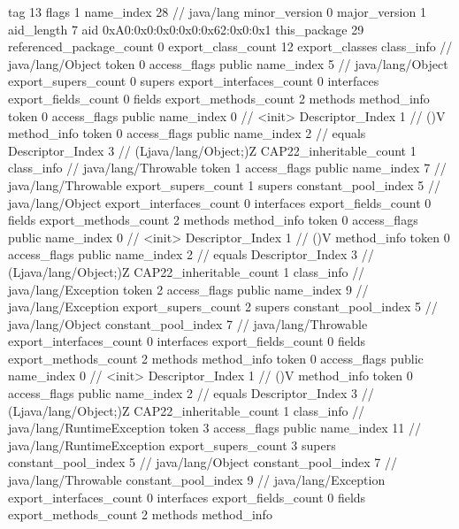 {{{			tag	13
			flags	1
			name_index	28		// java/lang
			minor_version	0
			major_version	1
			aid_length	7
			aid	0xA0:0x0:0x0:0x0:0x62:0x0:0x1
		}
	}
	this_package	29
	referenced_package_count	0
	export_class_count	12
	export_classes {
		class_info {		// java/lang/Object
			token	0
			access_flags	public
			name_index	5		// java/lang/Object
			export_supers_count	0
			supers {
			}
			export_interfaces_count	0
			interfaces {
			}
			export_fields_count	0
			fields {
			}
			export_methods_count	2
			methods {
				method_info {
					token	0
					access_flags	public
					name_index	0		// <init>
					Descriptor_Index	1		// ()V
				}
				method_info {
					token	0
					access_flags	public
					name_index	2		// equals
					Descriptor_Index	3		// (Ljava/lang/Object;)Z
				}
			}
			CAP22_inheritable_count	1
		}
		class_info {		// java/lang/Throwable
			token	1
			access_flags	public
			name_index	7		// java/lang/Throwable
			export_supers_count	1
			supers {
				constant_pool_index	5		// java/lang/Object
			}
			export_interfaces_count	0
			interfaces {
			}
			export_fields_count	0
			fields {
			}
			export_methods_count	2
			methods {
				method_info {
					token	0
					access_flags	public
					name_index	0		// <init>
					Descriptor_Index	1		// ()V
				}
				method_info {
					token	0
					access_flags	public
					name_index	2		// equals
					Descriptor_Index	3		// (Ljava/lang/Object;)Z
				}
			}
			CAP22_inheritable_count	1
		}
		class_info {		// java/lang/Exception
			token	2
			access_flags	public
			name_index	9		// java/lang/Exception
			export_supers_count	2
			supers {
				constant_pool_index	5		// java/lang/Object
				constant_pool_index	7		// java/lang/Throwable
			}
			export_interfaces_count	0
			interfaces {
			}
			export_fields_count	0
			fields {
			}
			export_methods_count	2
			methods {
				method_info {
					token	0
					access_flags	public
					name_index	0		// <init>
					Descriptor_Index	1		// ()V
				}
				method_info {
					token	0
					access_flags	public
					name_index	2		// equals
					Descriptor_Index	3		// (Ljava/lang/Object;)Z
				}
			}
			CAP22_inheritable_count	1
		}
		class_info {		// java/lang/RuntimeException
			token	3
			access_flags	public
			name_index	11		// java/lang/RuntimeException
			export_supers_count	3
			supers {
				constant_pool_index	5		// java/lang/Object
				constant_pool_index	7		// java/lang/Throwable
				constant_pool_index	9		// java/lang/Exception
			}
			export_interfaces_count	0
			interfaces {
			}
			export_fields_count	0
			fields {
			}
			export_methods_count	2
			methods {
				method_info {
}}}}}
